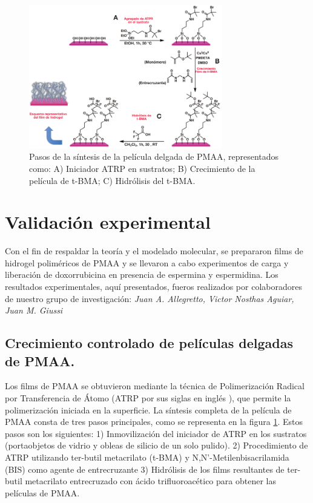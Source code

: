 

\begin{figure}[!htb]
	\centering
	\includegraphics[width=0.75\textwidth]{Figures/graph-film/exp_synt_scheme.pdf}
	\caption{Pasos de la s\'intesis de la pel\'icula delgada de PMAA, representados como: A) Iniciador ATRP en sustratos; B) Crecimiento de la pel\'icula de t-BMA; C) Hidr\'olisis del t-BMA.}
	\label{fig:film:synthesis_scheme}
\end{figure}




\section{Validaci\'on experimental}


Con el fin de respaldar la teor\'ia y el modelado molecular, se prepararon films de hidrogel polim\'ericos de PMAA y se llevaron a cabo experimentos de carga y liberaci\'on de doxorrubicina en presencia de espermina y espermidina.
Los resultados experimentales, aqu\'i presentados, fueros realizados por colaboradores de nuestro grupo de investigaci\'on: \textit{Juan A. Allegretto, Victor Nosthas Aguiar, Juan M. Giussi}



\subsection{Crecimiento controlado de pel\'iculas delgadas de PMAA.}

Los films  de PMAA se obtuvieron mediante la t\'ecnica de Polimerizaci\'on Radical por Transferencia de \'Atomo (ATRP por sus siglas en ingl\'es ), que permite la polimerizaci\'on iniciada en la superficie.
La s\'intesis completa de la pel\'icula de PMAA consta de tres pasos principales, como se representa en la figura \ref{fig:film:synthesis_scheme}. Estos pasos son los siguientes:
1) Inmovilizaci\'on del iniciador de ATRP en los sustratos (portaobjetos de vidrio y obleas de silicio de un solo pulido).
2) Procedimiento de ATRP utilizando ter-butil metacrilato (t-BMA) y N,N'-Metilenbisacrilamida (BIS) como agente de entrecruzante
3) Hidr\'olisis de los films resultantes de ter-butil metacrilato entrecruzado con \'acido trifluoroac\'etico para obtener las pel\'iculas de PMAA.


